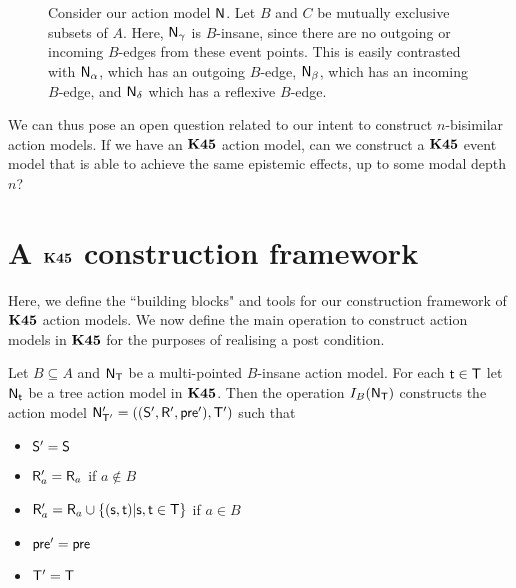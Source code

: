 \begin{figure}
\centering
{}
\caption[$B$-insane action models]{Consider our action model $\mathrm{\mathsf{N}}$. Let $B$ and $C$ be mutually exclusive
  subsets of $A$. Here, $\mathrm{\mathsf{N}}_\gamma$
  is $B$-insane, since there are no outgoing or incoming $B$-edges from these event points.
This is easily contrasted with $\mathrm{\mathsf{N}}_\alpha$, which has an outgoing $B$-edge, $\mathrm{\mathsf{N}}_\beta$, which
has an incoming $B$-edge, and $\mathrm{\mathsf{N}}_\delta$ which has a reflexive $B$-edge.}
\label{bInsaneExample}
\end{figure}

We can thus pose an open question related to our intent to construct $n$-bisimilar action models.
If we have an $\bf K45$ action model, can we construct a $\bf K45$ event model that is able to achieve
the same epistemic effects, up to some modal depth $n$?

\section{A $\bf K45$ construction framework} \label{subsec:k45:techPrelims}

Here, we define the ``building blocks" and tools for our construction framework of $\bf K45$ action models.
We now define the main operation to construct action models in $\bf K45$ for the
purposes of realising a post condition.

\begin{defn} \label{makeEquivalence}
	Let $B \subseteq A$ and $\mathrm{\mathsf{N}}_\mathrm{\mathsf{T}}$ be a multi-pointed $B$-insane action model.
  For each $\mathrm{\mathsf{t}} \in \mathrm{\mathsf{T}}$ let $\mathrm{\mathsf{N}}_\mathrm{\mathsf{t}}$ be a tree action model in $\bf K45$.
  Then the operation $I_B(\mathrm{\mathsf{N}}_\mathrm{\mathsf{T}})$ constructs the action model $\mathrm{\mathsf{N}}'_{\mathrm{\mathsf{T}}'} =
  ((\mathrm{\mathsf{S}}',\mathrm{\mathsf{R}}',\mathrm{\mathsf{pre}}'),\mathrm{\mathsf{T}}')$ such that
  \begin{itemize}
    \item $\mathrm{\mathsf{S}}' = \mathrm{\mathsf{S}}$
    \item $\mathrm{\mathsf{R}}'_a = \mathrm{\mathsf{R}}_a$ if $a \notin B$
    \item $\mathrm{\mathsf{R}}'_a = \mathrm{\mathsf{R}}_a \cup \{(\mathrm{\mathsf{s}}, \mathrm{\mathsf{t}}) | \mathrm{\mathsf{s}}, \mathrm{\mathsf{t}} \in \mathrm{\mathsf{T}}\}$ if $a
    \in B$
    \item $\mathrm{\mathsf{pre}}' = \mathrm{\mathsf{pre}}$
    \item $\mathrm{\mathsf{T}}' = \mathrm{\mathsf{T}}$
  \end{itemize}
\end{defn}

